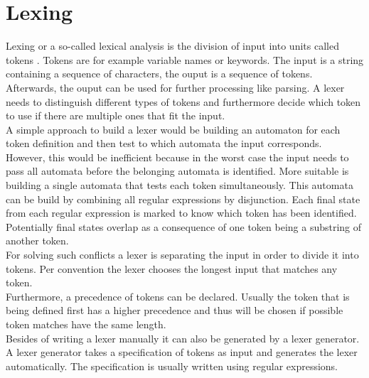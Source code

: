 \section{Lexing}\label{sec:BackgroundLexer}
Lexing or a so-called lexical analysis is the division of input into units called tokens \cite{LexYacc.1992}. Tokens are for example variable names or keywords.
The input is a string containing a sequence of characters, the ouput is a sequence of tokens. 
Afterwards, the ouput can be used for further processing like parsing.
A lexer needs to distinguish different types of tokens and furthermore decide which token to use if there are multiple ones that fit the input. \cite{Mogensen.2017}\\
A simple approach to build a lexer would be building an automaton for each token definition and then test to which automata the input corresponds.\\
However, this would be inefficient because in the worst case the input needs to pass all automata before the belonging automata is identified.
More suitable is building a single automata that tests each token simultaneously.
This automata can be build by combining all regular expressions by disjunction.
Each final state from each regular expression is marked to know which token has been identified.\\
Potentially final states overlap as a consequence of one token being a substring of another token. \\
For solving such conflicts a lexer is separating the input in order to divide it into tokens.
Per convention the lexer chooses the longest input that matches any token. \cite{Mogensen.2017} \\
Furthermore, a precedence of tokens can be declared. Usually the token that is being defined first has a higher precedence and thus will be chosen if possible token matches have the same length. \cite{Mogensen.2017}\\

Besides of writing a lexer manually it can also be generated by a lexer generator. A lexer generator takes a specification of tokens as input and generates the lexer automatically. 
The specification is usually written using regular expressions. 



